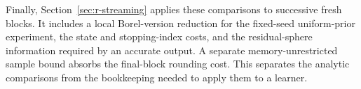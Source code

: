 Finally, Section~\ref{sec:r-streaming} applies these comparisons
to successive fresh blocks.  It includes a local Borel-version
reduction for the fixed-seed uniform-prior experiment, the state
and stopping-index costs, and the residual-sphere information
required by an accurate output.  A separate memory-unrestricted
sample bound absorbs the final-block rounding cost.  This separates the
analytic comparisons from the bookkeeping needed to apply them
to a learner.
